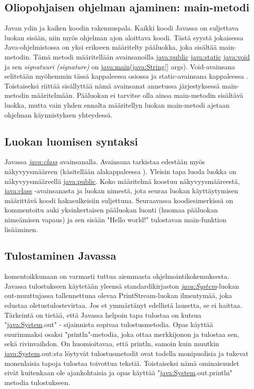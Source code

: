 \documentclass[a4paper,justified,notoc]{tufte-book}
\newcommand{\eng}[1]{\textit{(#1)}}
\newcommand{\new}[1]{\textit{\gls{#1}}}
\newcommand{\neweng}[2]{\new{#1} \eng{#2}}
\newcommand{\java}[1]{\underline{\gls{java:#1}}}
\newcommand{\newjava}[1]{\textit{\java{#1}}}
\begin{document}
\begin{fullwidth}
\subsection{Oliopohjaisen ohjelman ajaminen: main-metodi}
\label{main}

 Javan ydin ja kaiken koodin rakennuspala. Kaikki koodi Javassa on
suljettava luokan sisään, niin myös ohjelman ajon aloittava koodi. Tästä syystä jokaisessa
Java-ohjelmistossa on yksi erikseen määritelty pääluokka, joka sisältää main-metodin. Tämä
metodi määritellään avainsanoilla \java{public} \java{static} \java{void} ja sen 
\neweng{signatuuri}{signature} on \java{main}(\java{String}[] args). Void-avainsana selitetään
myöhemmin tässä kappaleessa osiossa  ja static-avainsana kappaleessa
. Toistaiseksi riittää sisällyttää nämä avainsanat annetussa järjestyksessä
main-metodin määritelmään. Pääluokan ei tarvitse olla ainoa main-metodin sisältävä luokka, mutta
vain yhden ennalta määritellyn luokan main-metodi ajetaan ohjelman käynnistyksen yhteydessä.

\subsection{Luokan luomisen syntaksi}
\label{luokka}

 Javassa \newjava{class} avainsanalla. Avainsana tarkistaa edestään
myös näkyvyysmääreen (käsitellään alakappaleessa ). Yleisin tapa luoda
luokka on näkyvyysmääreellä \java{public}. Koko määritelmä koostuu näkyvyysmääreestä,
\java{class} -avainsanasta ja luokan nimestä, jota seuraa luokan käyttäytymisen määrittävä koodi
hakasulkeisiin suljettuna. Seuraavassa koodiesimerkissä on kommentoitu auki yksinkertaisen
pääluokan luonti (huomaa pääluokan nimeämisen vapaus) ja sen sisään "Hello world!" tulostavan
main-funktion lisääminen.

\subsection{Tulostaminen Javassa}
\label{print}

 komentoikkunaan on varmasti tuttua aiemmasta
ohjelmointikokemuksesta. Javassa tulostukseen käytetään yleensä standardikirjaston 
\newjava{System}-luokan out-muuttujassa tallennettuna olevaa PrintStream-luokan ilmentymää, joka
edustaa oletustulostevirtaa. Jos et ymmärtänyt edellistä lausetta, se ei haittaa. Tärkeintä on
tietää, että Javassa helpoin tapa tulostaa on kutsua "\java{System}.out" - sijainnista sopivaa
tulostusmetodia. Opas käyttää suurimmaksi osaksi "println"-metodia, joka ottaa merkkijonon ja
tulostaa sen, sekä rivinvaihdon. On huomioitavaa, että println, samoin kuin muutkin
\java{System}.out:sta löytyvät tulostusmetodit ovat todella monipuolisia ja tukevat monenlaisia
tapoja tulostaa toivottua tekstiä. Toistaiseksi nämä ominaisuudet eivät kuitenkaan ole
ajankohtaisia ja opas käyttää "\java{System}.out.println" metodia tulostukseen.


\end{fullwidth}
\end{document}
